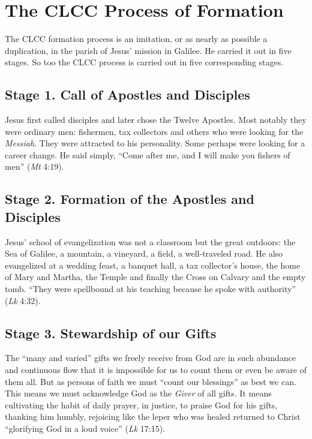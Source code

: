 \documentclass{article}
\begin{document}
\section{The CLCC Process of Formation}

The CLCC formation process is an imitation, or as nearly as possible a
duplication, in the parish of Jesus' mission in Galilee. He carried it out in
five stages. So too the CLCC process is carried out in five corresponding
stages.

\subsection{Stage 1. Call of Apostles and Disciples}

Jesus first called disciples and later chose the Twelve Apostles. Most notably
they were ordinary men: fishermen, tax collectors and others who were looking
for the \emph{Messiah}. They were attracted to his personality. Some perhaps
were looking for a career change. He said simply, ``Come after me, and I will
make you fishers of men'' (\emph{Mt} 4:19).

\subsection{Stage 2. Formation of the Apostles and Disciples}

Jesus' school of evangelization was not a classroom but the great outdoors: the
Sea of Galilee, a mountain, a vineyard, a field, a well-traveled road. He also
evangelized at a wedding feast, a banquet hall, a tax collector's house, the
home of Mary and Martha, the Temple and finally the Cross on Calvary and the
empty tomb. ``They were spellbound at his teaching because he spoke with
authority'' (\emph{Lk} 4:32).

\subsection{Stage 3. Stewardship of our Gifts}

The ``many and varied'' gifts we freely receive from God are in such abundance
and continuous flow that it is impossible for us to count them or even be aware
of them all. But as persons of faith we must ``count our blessings'' as best we
can. This means we must acknowledge God as the \emph{Giver} of all gifts. It
means cultivating the habit of daily prayer, in justice, to praise God for his
gifts, thanking him humbly, rejoicing like the leper who was healed returned to
Christ ``glorifying God in a loud voice'' (\emph{Lk} 17:15).
\end{document}
